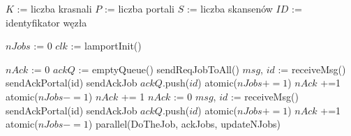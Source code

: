\documentclass{article}
\begin{document}
    \begin{algorithmic}[1]
        \State $K$ := liczba krasnali 
        \State $P$ := liczba portali
        \State $S$ := liczba skansenów
        \State $ID$ := identyfikator węzła

        \State $nJobs$ := 0
        \State $clk$ := lamportInit()

            \State $nAck$ := 0
            \State $ackQ$ := emptyQueue()
            \State sendReqJobToAll()
             
                \State $msg$, $id$ := receiveMsg()
                    \State sendAckPortal(id)
                        \State sendAckJob
                    \Else
                        \State $ackQ$.push($id$)
                    \EndIf
                    \State atomic($nJobs += 1$)
                        \State $nAck$ +=1
                        \State atomic($nJobs -= 1$)
                    \Else
                        \State $nAck$ += 1
                    \EndIf
                \EndIf
            \EndWhile
            \State $nAck$ := 0
             
                \State $msg$, $id$ := receiveMsg()
                    \State sendAckPortal(id)
                        \State sendAckJob
                    \Else
                        \State $ackQ$.push($id$)
                    \EndIf
                    \State atomic($nJobs += 1$)
                    \State $nAck$ +=1
                    \State atomic($nJobs -= 1$)
                \EndIf
            \EndWhile
            \State parallel(DoTheJob, ackJobs, updateNJobs)
        \EndWhile
        \end{algorithmic}
\end{document}
